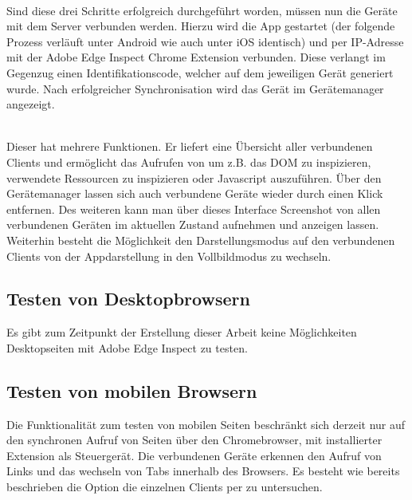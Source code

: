 		\\Sind diese drei Schritte erfolgreich durchgeführt worden, müssen nun die Geräte mit dem Server verbunden werden. Hierzu 		wird die App gestartet (der folgende Prozess verläuft unter Android wie auch unter iOS identisch) und per IP-Adresse mit 			der Adobe Edge Inspect Chrome Extension verbunden. Diese verlangt im Gegenzug einen Identifikationscode, 			welcher auf dem jeweiligen Gerät generiert wurde. Nach erfolgreicher Synchronisation wird das Gerät im Gerätemanager 		angezeigt.

		\\Dieser hat mehrere Funktionen. Er liefert eine Übersicht aller verbundenen Clients und ermöglicht das Aufrufen von 			 um z.B. das DOM zu inspizieren, verwendete Ressourcen zu inspizieren oder Javascript auszuführen. Über 			den Gerätemanager lassen sich auch verbundene Geräte wieder durch einen Klick entfernen. Des weiteren kann man über 		dieses Interface Screenshot von allen verbundenen Geräten im aktuellen Zustand aufnehmen und anzeigen lassen. 			Weiterhin besteht die Möglichkeit den Darstellungsmodus auf den verbundenen Clients von der Appdarstellung in den 			Vollbildmodus zu wechseln.
		
		\subsection{Testen von Desktopbrowsern}
		Es gibt zum Zeitpunkt der Erstellung dieser Arbeit keine Möglichkeiten Desktopseiten mit Adobe Edge Inspect zu testen.
		
		\subsection{Testen von mobilen Browsern}
		Die Funktionalität zum testen von mobilen Seiten beschränkt sich derzeit nur auf den synchronen Aufruf von Seiten über 			den Chromebrowser, mit installierter Extension als Steuergerät. Die verbundenen Geräte erkennen den Aufruf von Links 			und das wechseln von Tabs innerhalb des Browsers. Es besteht wie bereits beschrieben die Option die einzelnen Clients 			per  zu untersuchen.
		
